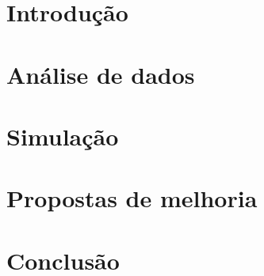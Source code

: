 \documentclass[12pt]{article}
\begin{document}



\newpage{}
\tableofcontents{}
\newpage{}

\section{Introdução}
\label{section: intro}


\section{Análise de dados}









\section{Simulação}
\label{section: simulacao}




\section{Propostas de melhoria}
\label{section: propostas}


\section{Conclusão}
\label{section: conclusao}

\end{document}

